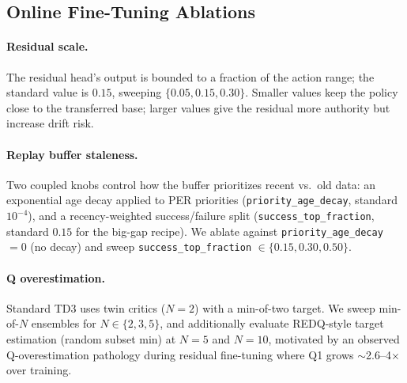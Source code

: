 \documentclass{article}
\begin{document}
\subsection{Online Fine-Tuning Ablations}
\label{sec:ablations:online}

    \paragraph{Residual scale.} The residual head's output is bounded to a fraction of the action range; the standard value is $0.15$, sweeping $\{0.05, 0.15, 0.30\}$. Smaller values keep the policy close to the transferred base; larger values give the residual more authority but increase drift risk.

    \paragraph{Replay buffer staleness.} Two coupled knobs control how the buffer prioritizes recent vs.\ old data: an exponential age decay applied to PER priorities (\texttt{priority\_age\_decay}, standard $10^{-4}$), and a recency-weighted success/failure split (\texttt{success\_top\_fraction}, standard $0.15$ for the big-gap recipe). We ablate against \texttt{priority\_age\_decay} $= 0$ (no decay) and sweep \texttt{success\_top\_fraction} $\in \{0.15, 0.30, 0.50\}$.

    \paragraph{Q overestimation.} Standard TD3 uses twin critics ($N{=}2$) with a min-of-two target. We sweep min-of-$N$ ensembles for $N \in \{2, 3, 5\}$, and additionally evaluate REDQ-style target estimation (random subset min) at $N{=}5$ and $N{=}10$, motivated by an observed Q-overestimation pathology during residual fine-tuning where Q1 grows $\sim$2.6--4$\times$ over training.
\end{document}
